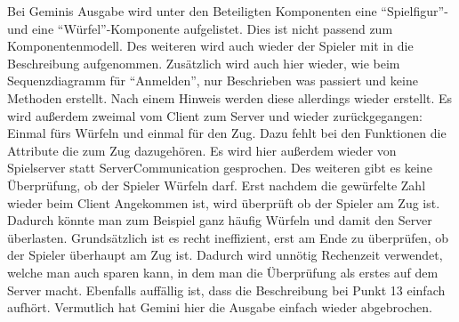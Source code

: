 Bei Geminis Ausgabe wird unter den Beteiligten Komponenten eine ``Spielfigur''- und eine ``Würfel''-Komponente 
aufgelistet. Dies ist nicht passend zum Komponentenmodell. Des weiteren wird auch wieder der Spieler mit in die 
Beschreibung aufgenommen. Zusätzlich wird auch hier wieder, wie beim Sequenzdiagramm für ``Anmelden'', nur 
Beschrieben was passiert und keine Methoden erstellt. Nach einem Hinweis werden diese allerdings wieder erstellt. 
Es wird außerdem zweimal vom Client zum Server und wieder zurückgegangen: Einmal fürs Würfeln und einmal für den
Zug. Dazu fehlt bei den Funktionen die Attribute die zum Zug dazugehören. Es wird hier außerdem wieder von Spielserver 
statt ServerCommunication gesprochen. Des weiteren gibt es keine Überprüfung, ob der Spieler Würfeln darf. Erst nachdem 
die gewürfelte Zahl wieder beim Client Angekommen ist, wird überprüft ob der Spieler am Zug ist. Dadurch könnte man 
zum Beispiel ganz häufig Würfeln und damit den Server überlasten. Grundsätzlich ist es recht ineffizient, erst am 
Ende zu überprüfen, ob der Spieler überhaupt am Zug ist. Dadurch wird unnötig Rechenzeit verwendet, welche man auch sparen 
kann, in dem man die Überprüfung als erstes auf dem Server macht. Ebenfalls auffällig ist, dass die Beschreibung bei Punkt 
13 einfach aufhört. Vermutlich hat Gemini hier die Ausgabe einfach wieder abgebrochen.

